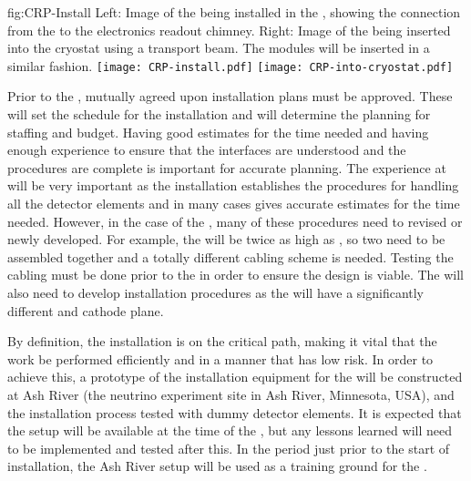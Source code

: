 \begin{dunefigure}{fig:CRP-Install}
  {Left: Image of the   being installed in
  the , showing the connection from the  to the
  electronics readout chimney. Right: Image of the  being
  inserted into the cryostat using a transport beam.  The \dual {} modules will be inserted in a similar fashion.}
\texttt{[image: CRP-install.pdf]}
\texttt{[image: CRP-into-cryostat.pdf]}
\end{dunefigure}

Prior to the , mutually agreed upon installation plans must
be approved. These will set the schedule for the installation and will
determine the planning for staffing and budget. Having good estimates
for the time needed and having enough experience to ensure that the
interfaces are understood and the procedures are complete is important
for accurate planning. The experience at  will be
very important as the  installation establishes the
procedures for handling all the detector elements and in many cases
gives accurate estimates for the time needed. However, in the case of
the , many of these procedures need to revised or
newly developed. For example, the  will be twice as high as
, so two  need to be assembled together
and a totally different cabling scheme is needed. Testing the
cabling must be done prior to the  %
in order to
ensure the design is viable. The  will also need to develop
installation procedures as the  
will have a significantly different  and cathode plane. 

By definition, the installation  is on the critical path, making it vital
that the work be performed efficiently and in a manner that has low
risk. In order to achieve this, a prototype of the installation
equipment for the   will be constructed at Ash
River (the \nova neutrino experiment  site in Ash River, Minnesota, USA), and the installation process tested with dummy detector
elements. It is expected that the setup will be available at the time
of the , but any lessons learned will need to be implemented and
tested after this. In the period just prior to the start of
installation, the Ash River setup will be used as a training ground for
the .



